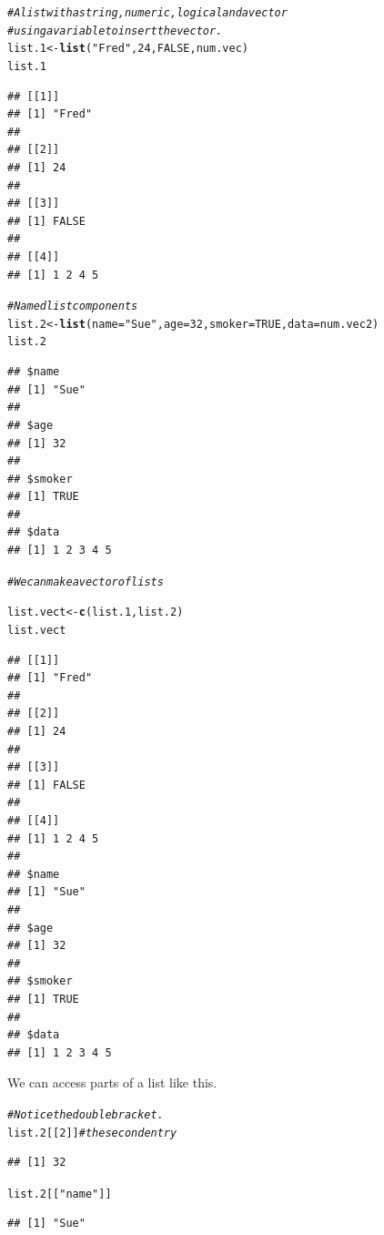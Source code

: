 \documentclass[draft]{article}\usepackage[]{graphicx}\usepackage[]{color}
\makeatletter
\newcommand{\hlnum}[1]{\textcolor[rgb]{0.686,0.059,0.569}{#1}}%
\newcommand{\hlstr}[1]{\textcolor[rgb]{0.192,0.494,0.8}{#1}}%
\newcommand{\hlcom}[1]{\textcolor[rgb]{0.678,0.584,0.686}{\textit{#1}}}%
\newcommand{\hlstd}[1]{\textcolor[rgb]{0.345,0.345,0.345}{#1}}%
\newcommand{\hlkwb}[1]{\textcolor[rgb]{0.69,0.353,0.396}{#1}}%
\newcommand{\hlkwc}[1]{\textcolor[rgb]{0.333,0.667,0.333}{#1}}%
\newcommand{\hlkwd}[1]{\textcolor[rgb]{0.737,0.353,0.396}{\textbf{#1}}}%
\newenvironment{kframe}{%
 \def\at@end@of@kframe{}%
 \ifinner\ifhmode%
  \def\at@end@of@kframe{\end{minipage}}%
  \begin{minipage}{\columnwidth}%
 \fi\fi%
 \def\FrameCommand##1{\hskip\@totalleftmargin \hskip-\fboxsep
 \colorbox{shadecolor}{##1}\hskip-\fboxsep
     \hskip-\linewidth \hskip-\@totalleftmargin \hskip\columnwidth}%
 \MakeFramed {\advance\hsize-\width
   \@totalleftmargin\z@ \linewidth\hsize
   \@setminipage}}%
 {\par\unskip\endMakeFramed%
 \at@end@of@kframe}
\newenvironment{knitrout}{}{} %
\makeatother
\begin{document}
\begin{knitrout}
\color{fgcolor}\begin{kframe}
\begin{alltt}
  \hlcom{# A list with a string, numeric, logical and a vector}
  \hlcom{# using a variable to insert the vector.}
  \hlstd{list.1} \hlkwb{<-} \hlkwd{list}\hlstd{(}\hlstr{"Fred"}\hlstd{,} \hlnum{24}\hlstd{,} \hlnum{FALSE}\hlstd{, num.vec)}
  \hlstd{list.1}
\end{alltt}
\begin{verbatim}
## [[1]]
## [1] "Fred"
## 
## [[2]]
## [1] 24
## 
## [[3]]
## [1] FALSE
## 
## [[4]]
## [1] 1 2 4 5
\end{verbatim}
\begin{alltt}
  \hlcom{# Named list components}
  \hlstd{list.2} \hlkwb{<-} \hlkwd{list}\hlstd{(}\hlkwc{name}\hlstd{=}\hlstr{"Sue"}\hlstd{,} \hlkwc{age}\hlstd{=}\hlnum{32}\hlstd{,} \hlkwc{smoker}\hlstd{=}\hlnum{TRUE}\hlstd{,} \hlkwc{data}\hlstd{=num.vec2)}
  \hlstd{list.2}
\end{alltt}
\begin{verbatim}
## $name
## [1] "Sue"
## 
## $age
## [1] 32
## 
## $smoker
## [1] TRUE
## 
## $data
## [1] 1 2 3 4 5
\end{verbatim}
\begin{alltt}
  \hlcom{# We can make a vector of lists}

  \hlstd{list.vect} \hlkwb{<-} \hlkwd{c}\hlstd{(list.1, list.2)}
  \hlstd{list.vect}
\end{alltt}
\begin{verbatim}
## [[1]]
## [1] "Fred"
## 
## [[2]]
## [1] 24
## 
## [[3]]
## [1] FALSE
## 
## [[4]]
## [1] 1 2 4 5
## 
## $name
## [1] "Sue"
## 
## $age
## [1] 32
## 
## $smoker
## [1] TRUE
## 
## $data
## [1] 1 2 3 4 5
\end{verbatim}
\end{kframe}
\end{knitrout}
    
    We can access parts of a list like this.
    
\begin{knitrout}
\color{fgcolor}\begin{kframe}
\begin{alltt}
  \hlcom{# Notice the double bracket.}
  \hlstd{list.2[[}\hlnum{2}\hlstd{]]}  \hlcom{# the second entry}
\end{alltt}
\begin{verbatim}
## [1] 32
\end{verbatim}
\begin{alltt}
  \hlstd{list.2[[}\hlstr{"name"}\hlstd{]]}
\end{alltt}
\begin{verbatim}
## [1] "Sue"
\end{verbatim}
\end{kframe}
\end{knitrout}
    
\end{document}
